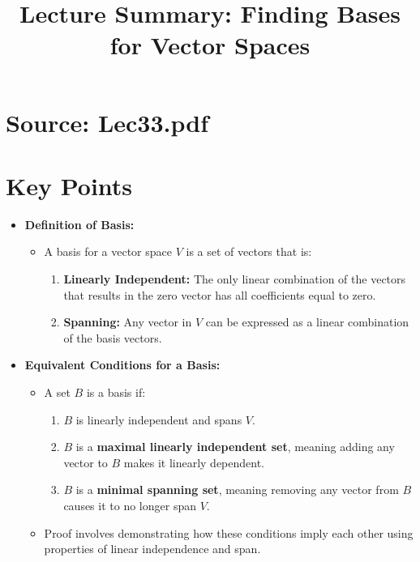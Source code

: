 \documentclass{article}
\title{Lecture Summary: Finding Bases for Vector Spaces}
\author{}
\date{}
\begin{document}
\maketitle

\section*{Source: Lec33.pdf}

\section*{Key Points}

\begin{itemize}
  \item \textbf{Definition of Basis:}
    \begin{itemize}
      \item A basis for a vector space $V$ is a set of vectors that is:
        \begin{enumerate}
          \item \textbf{Linearly Independent:} The only linear combination of the vectors that results in the zero vector has all coefficients equal to zero.
          \item \textbf{Spanning:} Any vector in $V$ can be expressed as a linear combination of the basis vectors.
        \end{enumerate}
    \end{itemize}

  \item \textbf{Equivalent Conditions for a Basis:}
    \begin{itemize}
      \item A set $B$ is a basis if:
        \begin{enumerate}
          \item $B$ is linearly independent and spans $V$.
          \item $B$ is a \textbf{maximal linearly independent set}, meaning adding any vector to $B$ makes it linearly dependent.
          \item $B$ is a \textbf{minimal spanning set}, meaning removing any vector from $B$ causes it to no longer span $V$.
        \end{enumerate}
      \item Proof involves demonstrating how these conditions imply each other using properties of linear independence and span.
    \end{itemize}


\end{itemize}
\end{document}
